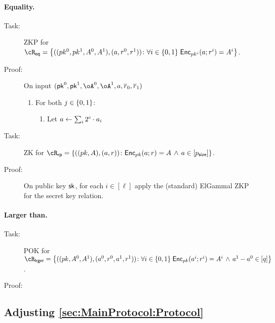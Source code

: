 \paragraph{Equality.}  


\begin{description}
	\item[Task:] ZKP for $\rEQ =\rEQDef$.
	
	\item[Proof:]  On input $(\pk^0,\pk^1,\oA^0,\oA^1,a,\orr_0,\orr_1)$ 
	

	\begin{enumerate}
		\item For both $j\in \zo$:
		
		\begin{enumerate}
			\item Let  $a \leftarrow  \sum_i  2^c \cdot a_i$ 
		\end{enumerate}
	
	
	\end{enumerate}
	
	\end{description}
		


  






\begin{description}
	\item[Task:] ZK for $\rRP =\rRPDef$.
	
	\item[Proof:] On public key ${\mathsf{sk}}$, for each  $i \in [\ell]$  apply the (standard) ElGammal ZKP for the secret key relation.
	
\end{description}

		
\paragraph{Larger than.}  

\begin{description}
	\item[Task:] POK for $\rLrg =\rLrgDef$.
	
	\item[Proof:] 
	
\end{description}
 




\subsection{Adjusting  \cref{sec:MainProtocol:Protocol}}\label{sec:ChanksEG:Adjusting}
